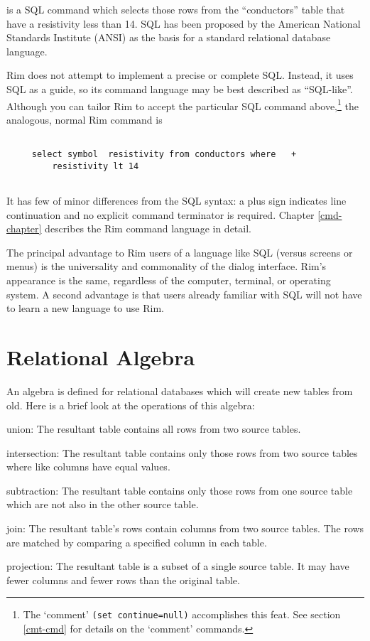 \documentclass[11pt,a4paper]{report}
\def\I{\index}
\begin{document}
\noindent
is a SQL command which selects those rows from the ``conductors''
table that have a resistivity less than 14.
SQL has been proposed by the American National Standards Institute (ANSI)
\I{ANSI}
as the basis for a standard relational database language.
 
 
Rim does not attempt to implement a precise or complete SQL.
Instead, it uses SQL as a guide, so its command language
may be best described as ``SQL-like''.
Although you can tailor Rim to accept the particular
SQL command above,\footnote{The `comment' {\tt  *(set continue=null)}
 \I{comments}
 accomplishes this feat. See section \ref{cmt-cmd}
 for details on the `comment' commands.}
 the analogous, normal Rim command is
 
\begin{verbatim}
 
     select symbol  resistivity from conductors where   +
         resistivity lt 14
 
\end{verbatim}
 
\noindent
It has few of minor differences from the SQL syntax:
a plus sign
indicates line continuation and no explicit command terminator is required.
Chapter \ref{cmd-chapter} describes the Rim command language
in detail.
 
\I{SQL}
The principal advantage to Rim users of a language like SQL
(versus screens or menus) is the universality
and commonality of the dialog interface.  Rim's appearance
is the same, regardless of the computer, terminal, or operating
system.
A second advantage is that users already familiar with
SQL will not have to learn a new language to use Rim.
 
\section{Relational Algebra}
\I{algebra} \I{relational database}
An algebra is defined for relational databases which will
create new tables from old.  Here is a brief look
at the operations of this algebra:
 
\begin{List}
\item[union:] The resultant table contains all rows from
  two source tables.
 
\item[intersection:] The resultant table contains only  those rows from
  two source tables where like columns have equal values.
 
\item[subtraction:] The resultant table contains only those rows from
  one source table which are not also in the other source table.
 
\item[join:] The resultant table's rows contain columns from
  two source tables.  The rows are matched by comparing a specified
  column in each table.
 
\item[projection:] The resultant table is a subset of a single
  source table.  It may have fewer columns and fewer rows
  than the original table.
 
\end{List}
 
\end{document}
